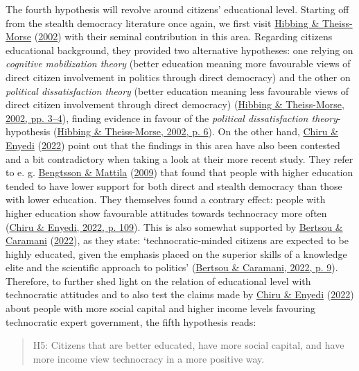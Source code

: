 \documentclass[
  12pt,
  english,
]{article}
\begin{document}
The fourth hypothesis will revolve around citizens' educational level.
Starting off from the stealth democracy literature once again, we first
visit \protect\hyperlink{ref-hibbing2002stealth}{Hibbing \&
Theiss-Morse} (\protect\hyperlink{ref-hibbing2002stealth}{2002}) with
their seminal contribution in this area. Regarding citizens educational
background, they provided two alternative hypotheses: one relying on
\emph{cognitive mobilization theory} (better education meaning more
favourable views of direct citizen involvement in politics through
direct democracy) and the other on \emph{political dissatisfaction
theory} (better education meaning less favourable views of direct
citizen involvement through direct democracy)
(\protect\hyperlink{ref-hibbing2002stealth}{Hibbing \& Theiss-Morse,
2002, pp. 3--4}), finding evidence in favour of the \emph{political
dissatisfaction theory}-hypothesis
(\protect\hyperlink{ref-hibbing2002stealth}{Hibbing \& Theiss-Morse,
2002, p. 6}). On the other hand,
\protect\hyperlink{ref-chiru2022wants}{Chiru \& Enyedi}
(\protect\hyperlink{ref-chiru2022wants}{2022}) point out that the
findings in this area have also been contested and a bit contradictory
when taking a look at their more recent study. They refer to e. g.
\protect\hyperlink{ref-bengtsson2009direct}{Bengtsson \& Mattila}
(\protect\hyperlink{ref-bengtsson2009direct}{2009}) that found that
people with higher education tended to have lower support for both
direct and stealth democracy than those with lower education. They
themselves found a contrary effect: people with higher education show
favourable attitudes towards technocracy more often
(\protect\hyperlink{ref-chiru2022wants}{Chiru \& Enyedi, 2022, p. 109}).
This is also somewhat supported by
\protect\hyperlink{ref-bertsou2022people}{Bertsou \& Caramani}
(\protect\hyperlink{ref-bertsou2022people}{2022}), as they state:
`technocratic-minded citizens are expected to be highly educated, given
the emphasis placed on the superior skills of a knowledge elite and the
scientific approach to politics'
(\protect\hyperlink{ref-bertsou2022people}{Bertsou \& Caramani, 2022, p.
9}). Therefore, to further shed light on the relation of educational
level with technocratic attitudes and to also test the claims made by
\protect\hyperlink{ref-chiru2022wants}{Chiru \& Enyedi}
(\protect\hyperlink{ref-chiru2022wants}{2022}) about people with more
social capital and higher income levels favouring technocratic expert
government, the fifth hypothesis reads:

\begin{quote}
H5: Citizens that are better educated, have more social capital, and
have more income view technocracy in a more positive way.
\end{quote}
\end{document}
